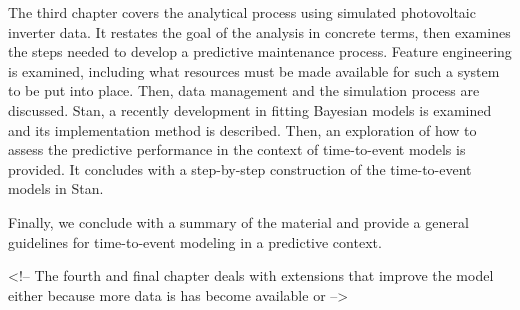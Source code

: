 The third chapter covers the analytical process using simulated photovoltaic inverter data. It restates the goal of the analysis in concrete terms, then examines the steps needed to develop a predictive maintenance process. Feature engineering is examined, including what resources must be made available for such a system to be put into place. Then, data management and the simulation process are discussed. Stan, a recently development in fitting Bayesian models is examined and its implementation method is described. Then, an exploration of how to assess the predictive performance in the context of time-to-event models is provided. It concludes with a step-by-step construction of the time-to-event models in Stan. 

Finally, we conclude with a summary of the material and provide a general guidelines for time-to-event modeling in a predictive context.


<!-- The fourth and final chapter deals with extensions that improve the model either because more data is has become available or  -->





